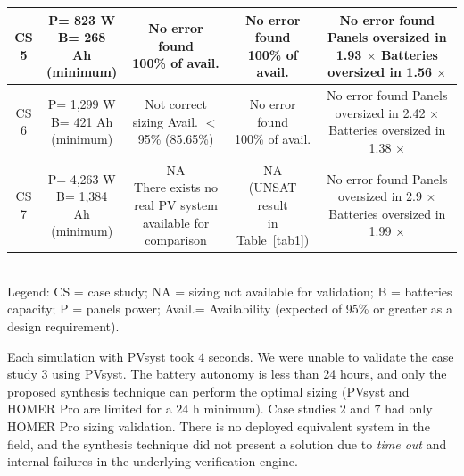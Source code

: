 \documentclass[10pt,journal,compsoc]{IEEEtran}
\begin{document}
\begin{table}
\begin{scriptsize}
\begin{tabular}{c|c|c|c|c}
\hline
CS 5 & \makecell{P= 823 W\\B= 268 Ah\\(minimum)} & \makecell{No error found \\100\% of avail.} & \makecell{No error found \\100\% of avail.} & \makecell{No error found\\Panels oversized in 1.93 $\times$\\Batteries oversized in 1.56 $\times$}\\
\hline
CS 6 & \makecell{P= 1,299 W\\B= 421 Ah\\(minimum)} & \makecell{Not correct sizing \\Avail. $<$ 95\%\\(85.65\%)} & \makecell{No error found \\100\% of avail.} & \makecell{No error found\\Panels oversized in 2.42 $\times$\\Batteries oversized in 1.38 $\times$}\\
\hline
CS 7 & \makecell{P= 4,263 W\\B= 1,384 Ah\\(minimum)} & \makecell{NA\\There exists no real PV system\\available for comparison} & \makecell{NA \\(UNSAT result\\in Table~\ref{tab1})} & \makecell{No error found\\Panels oversized in 2.9 $\times$\\Batteries oversized in 1.99 $\times$}\\
\hline
\hline
\end{tabular}
\\Legend: CS = case study; NA = sizing not available for validation; B = batteries capacity; P = panels power; Avail.= Availability (expected of 95\% or greater as a design requirement).
\end{scriptsize}
\end{table}

Each simulation with PVsyst took $4$ seconds. We were unable to validate the case study $3$ using PVsyst. The battery autonomy is less than 24 hours, and only the proposed synthesis technique can perform the optimal sizing (PVsyst and HOMER Pro are limited for a $24$ h minimum). Case studies $2$ and $7$ had only HOMER Pro sizing validation. There is no deployed equivalent system in the field, and the synthesis technique did not present a solution due to \textit{time out} and internal failures in the underlying verification engine. %
\end{document}
